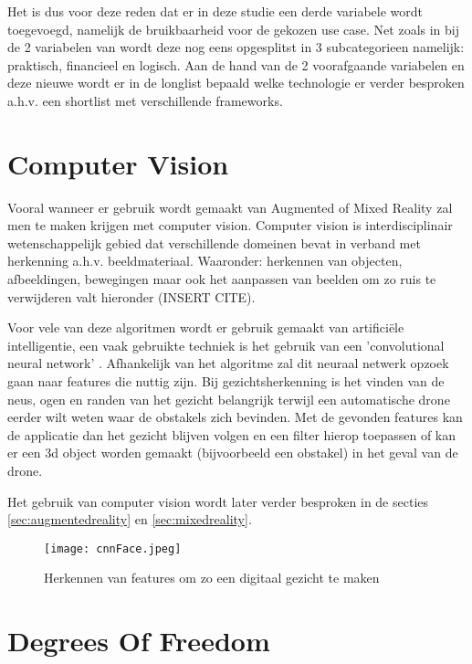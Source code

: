 Het is dus voor deze reden dat er in deze studie een derde variabele wordt toegevoegd, namelijk de bruikbaarheid voor de gekozen use case. Net zoals in bij de 2 variabelen van \textcite{Steuer1992} wordt deze nog eens opgesplitst in 3 subcategorieen namelijk: praktisch, financieel en logisch. Aan de hand van de 2 voorafgaande variabelen en deze nieuwe wordt er in de longlist bepaald welke technologie er verder besproken a.h.v. een shortlist met verschillende frameworks. 

\section{Computer Vision}

Vooral wanneer er gebruik wordt gemaakt van Augmented of Mixed Reality zal men te maken krijgen met computer vision. Computer vision is interdisciplinair wetenschappelijk gebied dat verschillende domeinen bevat in verband met herkenning a.h.v. beeldmateriaal. Waaronder: herkennen van objecten, afbeeldingen, bewegingen maar ook het aanpassen van beelden om zo ruis te verwijderen valt hieronder (INSERT CITE).

Voor vele van deze algoritmen wordt er gebruik gemaakt van artificiële intelligentie, een vaak gebruikte techniek is het gebruik van een 'convolutional neural network' \autocite{Ji2010}. Afhankelijk van het algoritme zal dit neuraal netwerk opzoek gaan naar features die nuttig zijn. Bij gezichtsherkenning is het vinden van de neus, ogen en randen van het gezicht belangrijk terwijl een automatische drone eerder wilt weten waar de obstakels zich bevinden. Met de gevonden features kan de applicatie dan het gezicht blijven volgen en een filter hierop toepassen of kan er een 3d object worden gemaakt (bijvoorbeeld een obstakel) in het geval van de drone. 

Het gebruik van computer vision wordt later verder besproken in de secties \ref{sec:augmentedreality} en \ref{sec:mixedreality}. %
\begin{figure}
    \texttt{[image: cnnFace.jpeg]}
    \caption{Herkennen van features om zo een digitaal gezicht te maken}
    \label{fig:cnnface}
\end{figure}

\section{Degrees Of Freedom}

